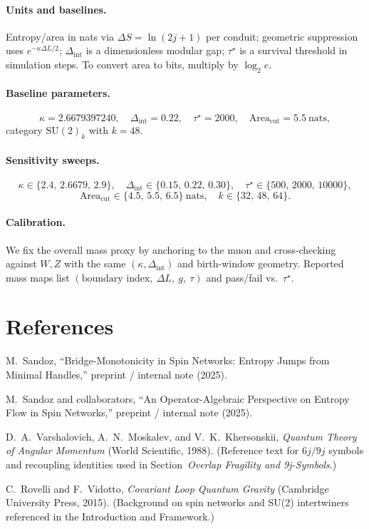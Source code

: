 \documentclass[11pt]{article}
\theoremstyle{plain}
\theoremstyle{definition}
\begin{document}
\paragraph{Units and baselines.}
Entropy/area in nats via $\Delta S=\ln(2j+1)$ per conduit; geometric suppression uses $e^{-\kappa \Delta L/2}$; $\Delta_{\mathrm{int}}$ is a dimensionless modular gap; $\tau^\star$ is a survival threshold in simulation steps. To convert area to bits, multiply by $\log_2 e$.

\paragraph{Baseline parameters.}
\[
  \kappa = 2.6679397240,\quad \Delta_{\mathrm{int}}=0.22,\quad \tau^\star=2000,\quad \mathrm{Area}_{\mathrm{cut}}=5.5\ \text{nats},
\]
category $\mathrm{SU}(2)_k$ with $k=48$.

\paragraph{Sensitivity sweeps.}
\[
  \kappa\in\{2.4,\,2.6679,\,2.9\},\quad
  \Delta_{\mathrm{int}}\in\{0.15,\,0.22,\,0.30\},\quad
  \tau^\star\in\{500,\,2000,\,10000\},
\]
\[
  \mathrm{Area}_{\mathrm{cut}}\in\{4.5,\,5.5,\,6.5\}\ \text{nats},\quad
  k\in\{32,\,48,\,64\}.
\]

\paragraph{Calibration.}
We fix the overall mass proxy by anchoring to the muon and cross-checking against $W,Z$ with the same $(\kappa,\Delta_{\mathrm{int}})$ and birth-window geometry. Reported mass maps list $(\text{boundary index},\ \Delta L,\ g,\ \tau)$ and pass/fail vs.\ $\tau^\star$.

\section*{References}
\begin{thebibliography}{99}

  M.~Sandoz,
  ``Bridge-Monotonicity in Spin Networks: Entropy Jumps from Minimal Handles,''
  preprint / internal note (2025).

  M.~Sandoz and collaborators,
  ``An Operator-Algebraic Perspective on Entropy Flow in Spin Networks,''
  preprint / internal note (2025).

  D.~A.~Varshalovich, A.~N.~Moskalev, and V.~K.~Khersonskii,
  \emph{Quantum Theory of Angular Momentum} (World Scientific, 1988).
  (Reference text for $6j/9j$ symbols and recoupling identities used in Section~\textit{Overlap Fragility and 9j-Symbols}.)

  C.~Rovelli and F.~Vidotto,
  \emph{Covariant Loop Quantum Gravity} (Cambridge University Press, 2015).
  (Background on spin networks and SU(2) intertwiners referenced in the Introduction and Framework.)

\end{thebibliography}
\end{document}
